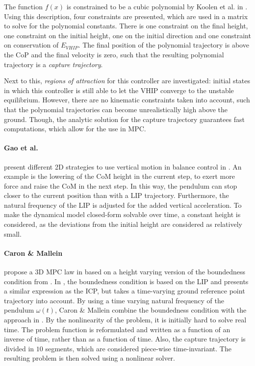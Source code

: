 The function $f(x)$ is constrained to be a cubic polynomial by Koolen et al. in \cite{koolen2016balance}. Using this description, four constraints are presented, which are used in a matrix to solve for the polynomial constants. There is one constraint on the final height, one constraint on the initial height, one on the initial direction and one constraint on conservation of $E_{VHIP}$. The final position of the polynomial trajectory is above the \ac{CoP} and the final velocity is zero, such that the resulting polynomial trajectory is a \textit{capture trajectory}. 

Next to this, \textit{regions of attraction} for this controller are investigated: initial states in which this controller is still able to let the \ac{VHIP} converge to the unstable equilibrium. However, there are no kinematic constraints taken into account, such that the polynomial trajectories can become unrealistically high above the ground. Though, the analytic solution for the capture trajectory guarantees fast computations, which allow for the use in \ac{MPC}.

\paragraph{Gao et al.} present different \ac{2D} strategies to use vertical motion in balance control in \cite{gao2017increase}. An example is the lowering of the \ac{CoM} height in the current step, to exert more force and raise the \ac{CoM} in the next step. In this way, the pendulum can stop closer to the current position than with a \ac{LIP} trajectory. Furthermore, the natural frequency of the \ac{LIP} is adjusted for the added vertical acceleration. To make the dynamical model closed-form solvable over time, a constant height is considered, as the deviations from the initial height are considered as relatively small.

\paragraph{Caron \& Mallein} propose a \ac{3D} \ac{MPC} law in \cite{caron2018balance} based on a height varying version of the boundedness condition from \cite{lanari2014boundedness}. In \cite{lanari2014boundedness}, the boundedness condition is based on the \ac{LIP} and presents a similar expression as the \ac{ICP}, but takes a time-varying ground reference point trajectory into account.  By using a time varying natural frequency of the pendulum $\omega(t)$, Caron \& Mallein combine the boundedness condition with the approach in \cite{hopkins2014humanoid}. By the nonlinearity of the problem, it is initially hard to solve real time. The problem function is reformulated and written as a function of an inverse of time, rather than as a function of time. Also, the capture trajectory is divided in $10$ segments, which are considered piece-wise time-invariant. The resulting problem is then solved using a nonlinear solver.

